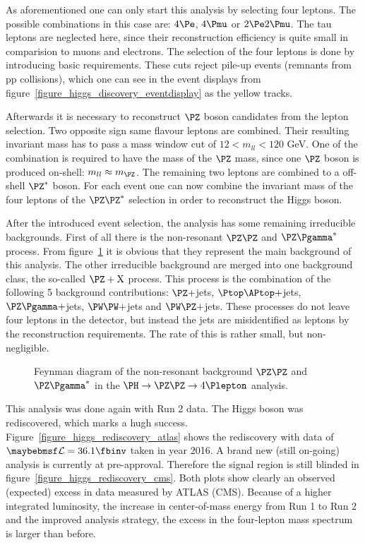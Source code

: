 As aforementioned one can only start this analysis by selecting four leptons. The possible combinations in this case are: $4\Pe$, $4\Pmu$ or $2\Pe2\Pmu$.
The tau leptons are neglected here, since their reconstruction efficiency is quite small in comparision to muons and electrons. The selection of the
four leptons is done by introducing basic requirements. These cuts reject pile-up events (remnants from pp collisions), which one can see in the event displays from figure~\ref{figure_higgs_discovery_eventdisplay}
as the yellow tracks.

Afterwards it is necessary to reconstruct $\PZ$ boson candidates from the lepton selection. Two opposite sign same flavour leptons are combined. Their resulting invariant
mass has to pass a mass window cut of $12 < m_{ll} < 120$ GeV. One of the combination is required to have the mass of the $\PZ$ mass, since one $\PZ$ boson is produced on-shell: $m_{ll}\approx m_{\PZ}$. The remaining
two leptons are combined to a off-shell $\PZ^*$ boson. For each event one can now combine the invariant mass of the four leptons of the $\PZ\PZ^*$
selection in order to reconstruct the Higgs boson.

After the introduced event selection, the analysis has some remaining irreducible backgrounds. First of all there is the non-resonant $\PZ\PZ$ and $\PZ\Pgamma^*$ process.
From figure~\ref{figure_higgs_background} it is obvious that they represent the main background of this analysis. The other irreducible background are merged into one background class, the so-called $\PZ + \mathrm{X}$ process.
This process is the combination of the following 5 background contributions: $\PZ+$jets, $\Ptop\APtop+$jets, $\PZ\Pgamma+$jets,
$\PW\PW+$jets and $\PW\PZ+$jets. These processes do not leave four leptons in the detector, but instead the jets are misidentified as leptons by the reconstruction requirements.
The rate of this is rather small, but non-negligible.

\begin{figure}[h!]
\centering

\caption{Feynman diagram of the non-resonant background $\PZ\PZ$ and $\PZ\Pgamma^*$ in the $\PH \rightarrow \PZ \PZ \rightarrow 4\Plepton$ analysis.}
\label{figure_higgs_background}
\end{figure}

This analysis was done again with Run 2 data. The Higgs boson was rediscovered, which marks a hugh success. Figure~\ref{figure_higgs_rediscovery_atlas} shows the rediscovery with data of $\luminosity=36.1\fbinv$ taken in year
2016. A brand new (still on-going) analysis is currently at pre-approval. Therefore the signal region is still blinded in figure~\ref{figure_higgs_rediscovery_cms}. Both plots show clearly an observed (expected) excess in data measured
by ATLAS (CMS). Because of a higher integrated luminosity, the increase in center-of-mass energy from Run 1 to Run 2 and the improved analysis strategy, the excess in the four-lepton mass spectrum is larger than before.

